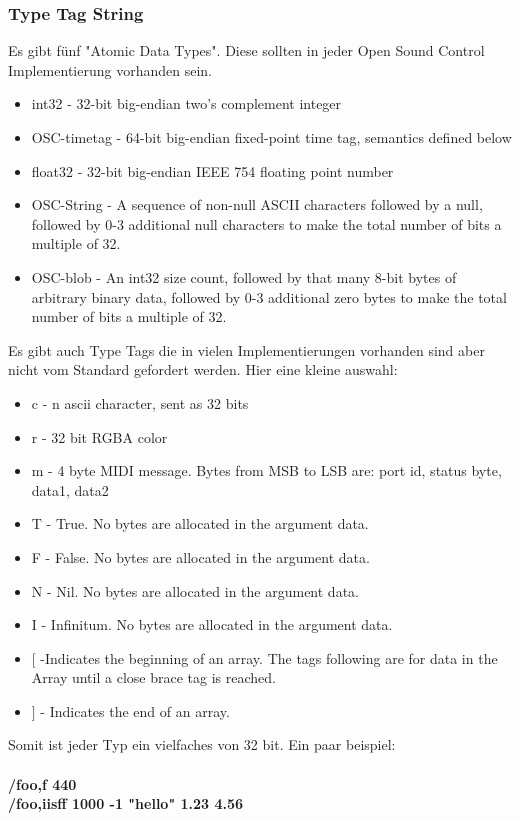 \documentclass[a4paper, 12pt]{article}
\begin{document}
\subsubsection{Type Tag String}
Es gibt fünf "Atomic Data Types"\cite{OSCspec}. Diese sollten in jeder Open Sound Control Implementierung vorhanden sein.
\begin{itemize}
	\item int32 - 32-bit big-endian two's complement integer
	\item OSC-timetag - 64-bit big-endian fixed-point time tag, semantics defined below
	\item float32 - 32-bit big-endian IEEE 754 floating point number
	\item OSC-String - A sequence of non-null ASCII characters followed by a null, followed by 0-3 additional null characters to make the total number of bits a multiple of 32.
	\item OSC-blob - An int32 size count, followed by that many 8-bit bytes of arbitrary binary data, followed by 0-3 additional zero bytes to make the total number of bits a multiple of 32.
\end{itemize}
Es gibt auch Type Tags die in vielen Implementierungen vorhanden sind aber nicht vom Standard gefordert werden. Hier eine kleine auswahl\cite{OSCspec}:
\begin{itemize}
\item c - n ascii character, sent as 32 bits
\item r - 32 bit RGBA color
\item m - 4 byte MIDI message. Bytes from MSB to LSB are: port id, status byte, data1, data2
\item T - True. No bytes are allocated in the argument data.
\item F - False. No bytes are allocated in the argument data.
\item N - Nil. No bytes are allocated in the argument data.
\item I - Infinitum. No bytes are allocated in the argument data.
\item $ [ $  -Indicates the beginning of an array. The tags following are for data in the Array until a close brace tag is reached.
\item $ ] $ - Indicates the end of an array.
\end{itemize}

Somit ist jeder Typ ein vielfaches von 32 bit. Ein paar beispiel:\\
\\
{\bf /foo,f 440}\\
{\bf /foo,iisff 1000 -1 "hello" 1.23 4.56}\\
\end{document}
